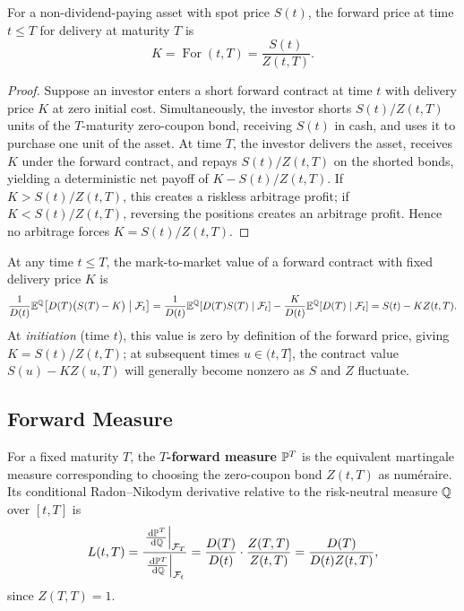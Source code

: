 \begin{theorem}\label{thm:forward-price}
    For a non-dividend-paying asset with spot price $S(t)$, the forward price at time $t \leq T$ for delivery at maturity $T$ is
    \[
    K = \operatorname{For}(t, T) = \frac{S(t)}{Z(t, T)}.
    \]
\end{theorem}
\begin{proof}
    Suppose an investor enters a short forward contract at time $t$ with delivery price $K$ at zero initial cost. Simultaneously, the investor shorts $S(t)/Z(t, T)$ units of the $T$-maturity zero-coupon bond, receiving $S(t)$ in cash, and uses it to purchase one unit of the asset. At time $T$, the investor delivers the asset, receives $K$ under the forward contract, and repays $S(t)/Z(t, T)$ on the shorted bonds, yielding a deterministic net payoff of $K - S(t)/Z(t, T)$. If $K > S(t)/Z(t, T)$, this creates a riskless arbitrage profit; if $K < S(t)/Z(t, T)$, reversing the positions creates an arbitrage profit. Hence no arbitrage forces $K = S(t)/Z(t, T)$.
\end{proof}
\begin{note}
    At any time $t \leq T$, the mark-to-market value of a forward contract with fixed delivery price $K$ is
    \[
    \frac{1}{D(t)}\mathbb{E}^{\mathbb{Q}}\!\left[D(T)\bigl(S(T) - K\bigr) \;\middle|\; \mathcal{F}_t\right]
    = \frac{1}{D(t)}\mathbb{E}^{\mathbb{Q}}[D(T)S(T) \mid \mathcal{F}_t] - \frac{K}{D(t)}\mathbb{E}^{\mathbb{Q}}[D(T) \mid \mathcal{F}_t] = S(t) - K Z(t, T).
    \]
    At \emph{initiation} (time $t$), this value is zero by definition of the forward price, giving $K = S(t)/Z(t, T)$; at subsequent times $u \in (t, T]$, the contract value $S(u) - K Z(u, T)$ will generally become nonzero as $S$ and $Z$ fluctuate.
\end{note}

\subsection{Forward Measure}
\begin{definition}\label{def:forward-measure}
    For a fixed maturity $T$, the \textbf{$T$-forward measure} $\mathbb{P}^T$ is the equivalent martingale measure corresponding to choosing the zero-coupon bond $Z(t, T)$ as num\'eraire. Its conditional Radon--Nikodym derivative relative to the risk-neutral measure $\mathbb{Q}$ over $[t, T]$ is
    \[
    L(t, T) = \frac{\left.\frac{\,\mathrm{d}\mathbb{P}^T}{\,\mathrm{d}\mathbb{Q}}\right|_{\mathcal{F}_T}}{\left.\frac{\,\mathrm{d}\mathbb{P}^T}{\,\mathrm{d}\mathbb{Q}}\right|_{\mathcal{F}_t}} = \frac{D(T)}{D(t)}\cdot\frac{Z(T, T)}{Z(t, T)} = \frac{D(T)}{D(t) Z(t, T)},
    \]
    since $Z(T, T) = 1$.
\end{definition}

